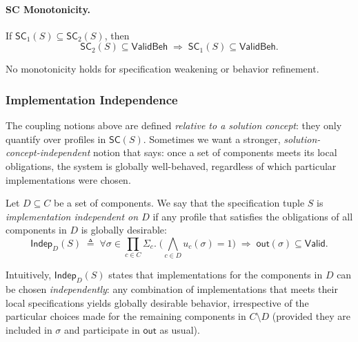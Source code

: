 \paragraph{SC Monotonicity.}

If $\mathsf{SC}_1(S)\subseteq\mathsf{SC}_2(S)$, then
\[
\mathsf{SC}_2(S) \subseteq \mathsf{ValidBeh}
\;\Rightarrow\;
\mathsf{SC}_1(S) \subseteq \mathsf{ValidBeh}.
\]

No monotonicity holds for specification weakening or behavior refinement.

\subsubsection{Implementation Independence}

The coupling notions above are defined \emph{relative to a solution concept}:
they only quantify over profiles in $\mathsf{SC}(S)$.
Sometimes we want a stronger, \emph{solution-concept-independent} notion that
says: once a set of components meets its local obligations, the system is
globally well-behaved, regardless of which particular implementations were
chosen.

Let $D \subseteq C$ be a set of components.
We say that the specification tuple $S$ is
\emph{implementation independent on $D$} if any profile that satisfies
the obligations of all components in $D$ is globally desirable:
\[
  \mathsf{Indep}_D(S)
  \;\triangleq\;
  \forall \sigma \in \textstyle\prod_{c\in C} \Sigma_c.\;
    \biggl(
      \bigwedge_{c\in D} u_c(\sigma) = 1
    \biggr)
    \;\Longrightarrow\;
    \mathsf{out}(\sigma) \subseteq \mathsf{Valid}.
\]

Intuitively, $\mathsf{Indep}_D(S)$ states that implementations for the
components in $D$ can be chosen \emph{independently}: any combination of
implementations that meets their local specifications yields globally
desirable behavior, irrespective of the particular choices made for the
remaining components in $C \setminus D$ (provided they are included in
$\sigma$ and participate in $\mathsf{out}$ as usual).

